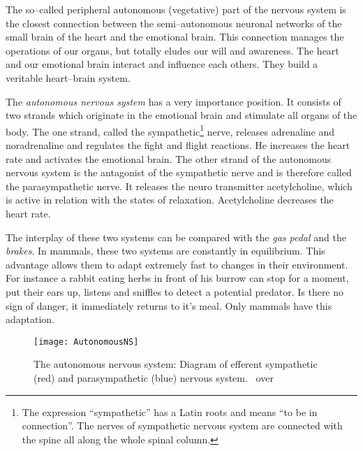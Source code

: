 \documentclass[../main.tex]{subfiles}
\begin{document}
The so--called peripheral autonomous (vegetative) part of the nervous system is the closest connection
between the semi--autonomous neuronal networks of the small brain of the heart and the emotional brain.
This connection manages the operations of our organs, but totally eludes our will and awareness.
The heart and our emotional brain interact and influence each others.
They build a veritable heart--brain system.

The \emph{autonomous nervous system} has a very importance position.
It consists of two strands which originate in the emotional brain and stimulate all organs of the body.
The one strand, called the sympathetic\footnote{The expression ``sympathetic'' has a Latin roots and means ``to be in connection''.
  The nerves of sympathetic nervous system are connected with the spine all along the whole spinal column.} nerve, 
releases adrenaline and noradrenaline and regulates the fight and flight reactions.
He increases the heart rate and activates the emotional brain.
The other strand of the autonomous nervous system is the antagonist of the sympathetic nerve and is therefore called the parasympathetic nerve.
It releases the neuro transmitter acetylcholine, which is active in relation with the states of relaxation.
Acetylcholine decreases the heart rate.

The interplay of these two systems can be compared with the \emph{gas pedal} and the \emph{brakes}.
In mammals, these two systems are constantly in equilibrium.
This advantage allows them to adapt extremely fast to changes in their environment.
For instance a rabbit eating herbs in front of his burrow can stop for a moment, put their ears up, listens and sniffles to detect a potential predator.
Is there no sign of danger, it immediately returns to it's meal.
Only mammals have this adaptation.

        \begin{figure}[htb!]
          \centering
          \texttt{[image: AutonomousNS]}
          \caption{The autonomous nervous system:
            Diagram of efferent sympathetic (red) and parasympathetic (blue) nervous system.~\cite{LeaAnatomy} over~\cite{Bartleby}}\label{pic:AutonomouNS}
        \end{figure}
\end{document}
